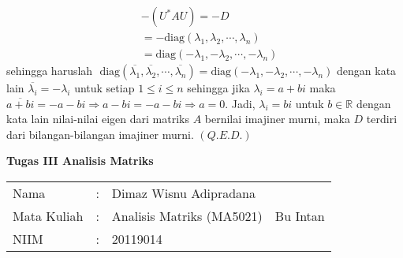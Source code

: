\documentclass[11pt,a4paper]{article}
\theoremstyle{plain}
\theoremstyle{definition}
\theoremstyle{remark}
\begin{document}
\begin{enumerate}
\begin{enumerate}
\begin{align*}
	& -(U^*AU) = -D \\
	&= -\text{diag}(\lambda_{1},\lambda_{2},\cdots,\lambda_{n}) \\
	&= \text{diag}(-\lambda_{1},-\lambda_{2},\cdots,-\lambda_{n})
	\end{align*}
	sehingga haruslah
	$\text{ diag}(\overline{\lambda_{1}},\overline{\lambda_{2}},\cdots,\overline{\lambda_{n}}) = \text{diag}(-\lambda_{1},-\lambda_{2},\cdots,-\lambda_{n})$ dengan kata lain $\overline{\lambda_{i}}=-\lambda_{i}$ untuk setiap $1\le i \le n$ sehingga jika $\lambda_{i}=a+bi$ maka $\overline{a+bi}=-a-bi\Rightarrow a-bi=-a-bi \Rightarrow a=0$. Jadi, $\lambda_{i}=bi$ untuk $b\in \mathbb{R}$ dengan kata lain nilai-nilai eigen dari matriks $A$ bernilai imajiner murni, maka $D$ terdiri dari bilangan-bilangan imajiner murni. $(Q.E.D.)$

\end{enumerate}
	

\newpage
	
	
\begin{center}
	\textbf{Tugas III Analisis Matriks}
\end{center}


\begin{tabular}{llll}
	Nama        & : & Dimaz Wisnu Adipradana    &          \\
	Mata Kuliah & : & Analisis Matriks (MA5021) & Bu Intan \\
	NIIM        & : & 20119014                  &         
\end{tabular}


\begin{enumerate}
	

\end{enumerate}
\end{enumerate}
\end{document}
